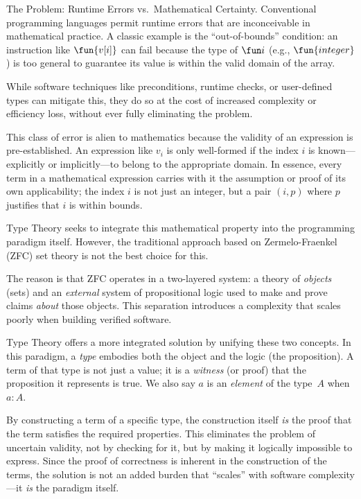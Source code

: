 \begin{paragraph}{The Problem: Runtime Errors vs.~Mathematical Certainty.}
    Conventional programming languages permit runtime errors that are inconceivable in mathematical practice. A classic example is the ``out-of-bounds'' condition: an instruction like $\fun{v[i]}$ can fail because the type of $\fun i$ (e.g., $\fun{integer}$) is too general to guarantee its value is within the valid domain of the array.

    While software techniques like preconditions, runtime checks, or user-defined types can mitigate this, they do so at the cost of increased complexity or efficiency loss, without ever fully eliminating the problem.

    This class of error is alien to mathematics because the validity of an expression is pre-established. An expression like $v_i$ is only well-formed if the index $i$ is known---explicitly or implicitly---to belong to the appropriate domain. In essence, every term in a mathematical expression carries with it the assumption or proof of its own applicability; the index $i$ is not just an integer, but a pair $(i,p)$ where $p$ justifies that $i$ is within bounds.

    Type Theory seeks to integrate this mathematical property into the programming paradigm itself. However, the traditional approach based on Zermelo-Fraenkel (ZFC) set theory is not the best choice for this.

    The reason is that ZFC operates in a two-layered system: a theory of \textit{objects} (sets) and an \textit{external} system of propositional logic used to make and prove claims \textit{about} those objects. This separation introduces a complexity that scales poorly when building verified software.

    Type Theory offers a more integrated solution by unifying these two concepts. In this paradigm, a \textit{type} embodies both the object and the logic (the proposition). A term of that type is not just a value; it is a \textit{witness} (or proof) that the proposition it represents is true. We also say $a$ is an \textsl{element} of the type~$A$ when $a\colon A$.

    By constructing a term of a specific type, the construction itself \textit{is} the proof that the term satisfies the required properties. This eliminates the problem of uncertain validity, not by checking for it, but by making it logically impossible to express. Since the proof of correctness is inherent in the construction of the terms, the solution is not an added burden that ``scales'' with software complexity---it \textit{is} the paradigm itself.
\end{paragraph}

